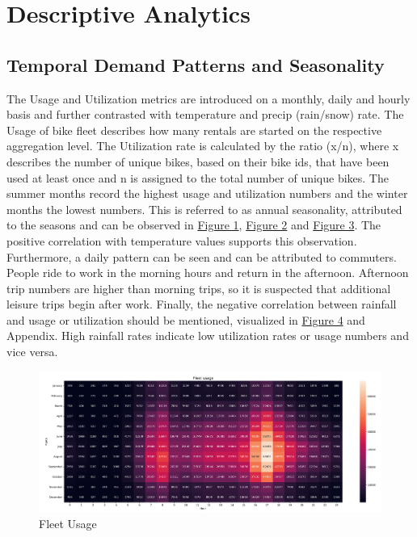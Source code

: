 
\section{Descriptive Analytics}
\label{sec:DescriptiveAnalytics}

\subsection{Temporal Demand Patterns and Seasonality}
\label{subsec:TempDemand}

The Usage and Utilization metrics are introduced on a monthly, daily and hourly basis and further contrasted with temperature and precip (rain/snow) rate. The Usage of bike fleet describes how many rentals are started on the respective aggregation level. The Utilization rate is calculated by the ratio (x/n), where x describes the number of unique bikes, based on their bike ids, that have been used at least once and n is assigned to the total number of unique bikes.
The summer months record the highest usage and utilization numbers and the winter months the lowest numbers. This is referred to as annual seasonality, attributed to the seasons and can be observed in \hyperref[heatmap]{Figure 1}, \hyperref[fleetUsageYear]{Figure 2} and \hyperref[fleetUtilizationYear]{Figure 3}. The positive correlation with temperature values supports this observation. Furthermore, a daily pattern can be seen and can be attributed to commuters. People ride to work in the morning hours and return in the afternoon. Afternoon trip numbers are higher than morning trips, so it is suspected that additional leisure trips begin after work.
Finally, the negative correlation between rainfall and usage or utilization should be mentioned, visualized in \hyperref[fleetUtilizationYear]{Figure 4} and Appendix. High rainfall rates indicate low utilization rates or usage numbers and vice versa.

\begin{figure}[H]
    \centering
    \includegraphics[width=1\linewidth]{./Figures/Usage_Heatmap.png}
    \caption{Fleet Usage}
    \label{heatmap}
\end{figure}

